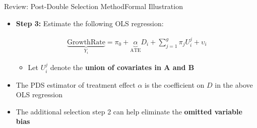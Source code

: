\documentclass[dvipsnames,hyperref={pdfpagelabels=false}]{beamer}
\begin{document}
\begin{frame}{Review: Post-Double Selection Method}{Formal Illustration}
\begin{itemize}

\item \textbf{Step 3:} Estimate the following OLS regression:

\begin{eqnarray*}
\underbrace{\mbox{GrowthRate}}_{Y_{i}} = \pi_{0} + \underbrace{ \alpha}_{\mbox{ATE}}  D_{i} + \sum^{g}_{j=1} \pi_{j} U^{j}_{i}  + \upsilon_{i}
\end{eqnarray*}	






\begin{itemize}
\item Let $U^{j}_{i}$ denote the \textbf{union of covariates in A and B}
\end{itemize}
\vspace{0.3cm}
\item The PDS estimator of treatment effect $\alpha$ is the coefficient on $D$ in the above OLS regression
\vspace{0.2cm}
	\item The additional selection step 2 can help eliminate the \textbf{omitted variable bias}



\end{itemize}



\end{frame}
\end{document}
